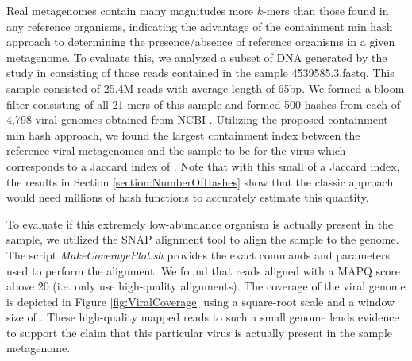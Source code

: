 \documentclass[11pt,reqno]{amsart}
\theoremstyle{remark}
\numberwithin{equation}{section}
\newcommand{\FoundOrganismContainment}{\protect }
\newcommand{\FoundOrganismJaccard}{\protect }
\newcommand{\FoundOrganismName}{\protect }
\newcommand{\NumReadsAligned}{\protect }
\newcommand{\WindowSize}{\protect }
\begin{document}
Real metagenomes contain many magnitudes more $k$-mers than those found in any reference organisms, indicating the advantage of the containment min hash approach to determining the presence/absence of reference organisms in a given metagenome. To evaluate this, we analyzed a subset of DNA generated by the study in \cite{howe2014tackling} consisting of those reads contained in the sample 4539585.3.fastq. This sample consisted of 25.4M reads with average length of 65bp. We formed a bloom filter consisting of all 21-mers of this sample and formed 500 hashes from each of 4,798 viral genomes obtained from NCBI \cite{wheeler2007database}. Utilizing the proposed containment min hash approach, we found the largest containment index between the reference viral metagenomes and the sample to be \FoundOrganismContainment for the virus \textit{\FoundOrganismName}which corresponds to a Jaccard index of \FoundOrganismJaccard \unskip. Note that with this small of a Jaccard index, the results in Section \ref{section:NumberOfHashes} show that the classic approach would need millions of hash functions to accurately estimate this quantity.


To evaluate if this extremely low-abundance organism is actually present in the sample, we utilized the SNAP alignment tool \cite{zaharia2011faster} to align the sample to the \textit{\FoundOrganismName} genome. The script \textit{MakeCoveragePlot.sh} provides the exact commands and parameters used to perform the alignment. We found that \NumReadsAligned reads aligned with a MAPQ score above 20 (i.e. only use high-quality alignments). The coverage of the viral genome is depicted in Figure \ref{fig:ViralCoverage} using a square-root scale and a window size of \WindowSize\unskip. 
These high-quality mapped reads to such a small genome lends evidence to support the claim that this particular virus is actually present in the sample metagenome.
\end{document}
